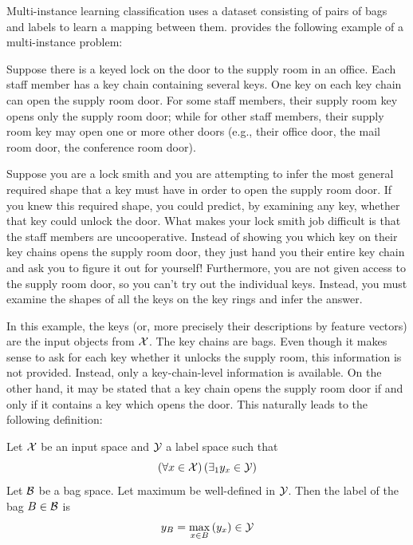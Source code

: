 Multi-instance learning classification uses a dataset consisting of pairs of bags and labels to learn a mapping between them. \cite{dietterich_solving_1997} provides the following example of a multi-instance problem:

\begin{example}
	Suppose there is a keyed lock on the door to the supply room in an office. Each staff member has a key chain containing several keys. One key on each key chain can open the supply room door. For some staff members, their supply room key opens only the supply room door; while for other staff members, their supply room key may open one or more other doors (e.g., their office door, the mail room door, the conference room door).

	Suppose you are a lock smith and you are attempting to infer the most general required shape that a key must have in order to open the supply room door. If you knew this required shape, you could predict, by examining any key, whether that key could unlock the door. What makes your lock smith job difficult is that the staff members are uncooperative. Instead of showing you which key on their key chains opens the supply room door, they just hand you their entire key chain and ask you to figure it out for yourself! Furthermore, you are not given access to the supply room door, so you can’t try out the individual keys. Instead, you must examine the shapes of all the keys on the key rings and infer the answer.
\end{example}

In this example, the keys (or, more precisely their descriptions by feature vectors) are the input objects from \( \mathcal{X} \). The key chains are bags. Even though it makes sense to ask for each key whether it unlocks the supply room, this information is not provided. Instead, only a key-chain-level information is available. On the other hand, it may be stated that a key chain opens the supply room door if and only if it contains a key which opens the door. This naturally leads to the following definition:

\begin{define}\label{def:baglabel}
	Let \( \mathcal{X} \) be an input space and \( \mathcal{Y} \) a label space such that
	\[ \left( \forall x \in \mathcal{X} \right) \left( \exists_1 y_x \in \mathcal{Y} \right) \]
	Let \( \mathcal{B} \) be a bag space. Let maximum be well-defined in \( \mathcal{Y} \). Then the label of the bag \( B \in \mathcal{B} \) is
	\[ y_B = \max_{x \in B} \left( y_x \right) \in \mathcal{Y} \]
\end{define}

